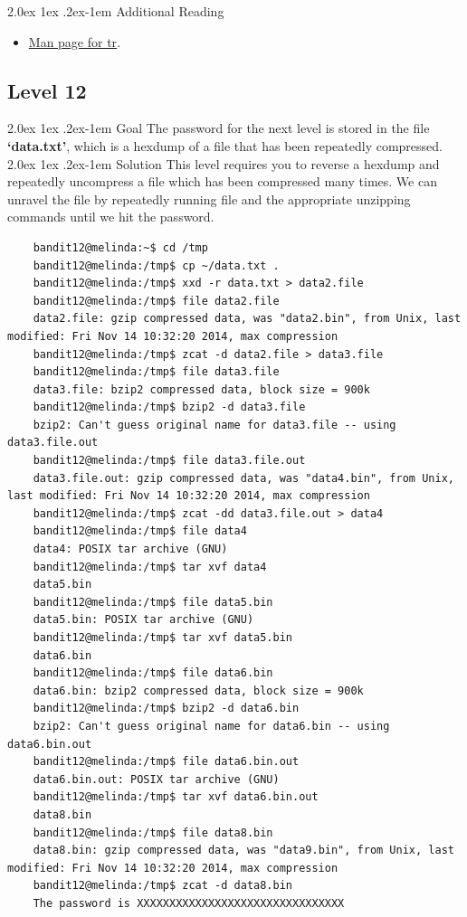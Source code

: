 \documentclass[11pt]{article}
\makeatletter
\renewcommand{\paragraph}{%
  \@startsection{paragraph}{4}%
  {\z@}{2.0ex \@plus 1ex \@minus .2ex}{-1em}%
  {\normalfont\normalsize\bfseries}%
}
\makeatother
\begin{document}
\paragraph{Additional Reading}
\begin{itemize}
\itemsep0em
\item \href{http://man7.org/linux/man-pages/man1/tr.1.html}{Man page for tr}.
\end{itemize}
\newpage
\subsection{Level 12}
\paragraph{Goal}
The password for the next level is stored in the file \textbf{`data.txt'}, which is a hexdump of a file that has been repeatedly compressed. 
\paragraph{Solution}
This level requires you to reverse a hexdump and repeatedly uncompress a file which has been compressed many times. We can unravel the file by repeatedly running file and the appropriate unzipping commands until we hit the password. 
\begin{lstlisting}
	bandit12@melinda:~$ cd /tmp 
	bandit12@melinda:/tmp$ cp ~/data.txt .
	bandit12@melinda:/tmp$ xxd -r data.txt > data2.file
	bandit12@melinda:/tmp$ file data2.file
	data2.file: gzip compressed data, was "data2.bin", from Unix, last modified: Fri Nov 14 10:32:20 2014, max compression
	bandit12@melinda:/tmp$ zcat -d data2.file > data3.file
	bandit12@melinda:/tmp$ file data3.file
	data3.file: bzip2 compressed data, block size = 900k
	bandit12@melinda:/tmp$ bzip2 -d data3.file
	bzip2: Can't guess original name for data3.file -- using data3.file.out
	bandit12@melinda:/tmp$ file data3.file.out
	data3.file.out: gzip compressed data, was "data4.bin", from Unix, last modified: Fri Nov 14 10:32:20 2014, max compression
	bandit12@melinda:/tmp$ zcat -dd data3.file.out > data4
	bandit12@melinda:/tmp$ file data4
	data4: POSIX tar archive (GNU)
	bandit12@melinda:/tmp$ tar xvf data4
	data5.bin
	bandit12@melinda:/tmp$ file data5.bin
	data5.bin: POSIX tar archive (GNU)
	bandit12@melinda:/tmp$ tar xvf data5.bin
	data6.bin
	bandit12@melinda:/tmp$ file data6.bin
	data6.bin: bzip2 compressed data, block size = 900k
	bandit12@melinda:/tmp$ bzip2 -d data6.bin
	bzip2: Can't guess original name for data6.bin -- using data6.bin.out
	bandit12@melinda:/tmp$ file data6.bin.out
	data6.bin.out: POSIX tar archive (GNU)
	bandit12@melinda:/tmp$ tar xvf data6.bin.out
	data8.bin
	bandit12@melinda:/tmp$ file data8.bin
	data8.bin: gzip compressed data, was "data9.bin", from Unix, last modified: Fri Nov 14 10:32:20 2014, max compression
	bandit12@melinda:/tmp$ zcat -d data8.bin
	The password is XXXXXXXXXXXXXXXXXXXXXXXXXXXXXXXX
\end{lstlisting}
\end{document}
